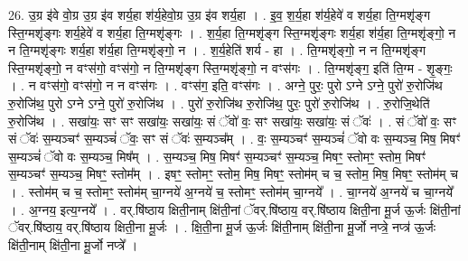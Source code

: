 \documentclass[17pt]{extarticle}
\begin{document}
26. उ॒ग्र इ॑वे वो॒ग्र उ॒ग्र इ॑व शर्य॒हा श॑र्य॒हेवो॒ग्र उ॒ग्र इ॑व शर्य॒हा । . इ॒व॒ श॒र्य॒हा श॑र्य॒हेवे॑ व शर्य॒हा ति॒ग्मशृ॑ङ्ग स्ति॒ग्मशृ॑ङ्गः शर्य॒हेवे॑ व शर्य॒हा ति॒ग्मशृ॑ङ्गः । . श॒र्य॒हा ति॒ग्मशृ॑ङ्ग स्ति॒ग्मशृ॑ङ्गः शर्य॒हा श॑र्य॒हा ति॒ग्मशृ॑ङ्गो॒ न न ति॒ग्मशृ॑ङ्गः शर्य॒हा श॑र्य॒हा ति॒ग्मशृ॑ङ्गो॒ न । . श॒र्य॒हेति॑ शर्य - हा । . ति॒ग्मशृ॑ङ्गो॒ न न ति॒ग्मशृ॑ङ्ग स्ति॒ग्मशृ॑ङ्गो॒ न वꣳस॑गो॒ वꣳस॑गो॒ न ति॒ग्मशृ॑ङ्ग स्ति॒ग्मशृ॑ङ्गो॒ न वꣳस॑गः । . ति॒ग्मशृ॑ङ्ग॒ इति॑ ति॒ग्म - शृ॒ङ्गः॒ । . न वꣳस॑गो॒ वꣳस॑गो॒ न न वꣳस॑गः । . वꣳस॑ग॒ इति॒ वꣳस॑गः । . अग्ने॒ पुरः॒ पुरो ऽग्ने ऽग्ने॒ पुरो॑ रु॒रोजि॑थ रु॒रोजि॑थ॒ पुरो ऽग्ने ऽग्ने॒ पुरो॑ रु॒रोजि॑थ । . पुरो॑ रु॒रोजि॑थ रु॒रोजि॑थ॒ पुरः॒ पुरो॑ रु॒रोजि॑थ । . रु॒रोजि॒थेति॑ रु॒रोजि॑थ । . सखा॑यः॒ सꣳ सꣳ सखा॑यः॒ सखा॑यः॒ सं ॅवो॑ वः॒ सꣳ सखा॑यः॒ सखा॑यः॒ सं ॅवः॑ । . सं ॅवो॑ वः॒ सꣳ सं ॅवः॑ स॒म्यञ्चꣳ॑ स॒म्यञ्चं॑ ॅवः॒ सꣳ सं ॅवः॑ स॒म्यञ्च᳚म् । . वः॒ स॒म्यञ्चꣳ॑ स॒म्यञ्चं॑ ॅवो वः स॒म्यञ्च॒ मिष॒ मिषꣳ॑ स॒म्यञ्चं॑ ॅवो वः स॒म्यञ्च॒ मिष᳚म् । . स॒म्यञ्च॒ मिष॒ मिषꣳ॑ स॒म्यञ्चꣳ॑ स॒म्यञ्च॒ मिषꣳ॒॒ स्तोमꣳ॒॒ स्तोम॒ मिषꣳ॑ स॒म्यञ्चꣳ॑ स॒म्यञ्च॒ मिषꣳ॒॒ स्तोम᳚म् । . इषꣳ॒॒ स्तोमꣳ॒॒ स्तोम॒ मिष॒ मिषꣳ॒॒ स्तोम॑म् च च॒ स्तोम॒ मिष॒ मिषꣳ॒॒ स्तोम॑म् च । . स्तोम॑म् च च॒ स्तोमꣳ॒॒ स्तोम॑म् चा॒ग्नये॑ अ॒ग्नये॑ च॒ स्तोमꣳ॒॒ स्तोम॑म् चा॒ग्नये᳚ । . चा॒ग्नये॑ अ॒ग्नये॑ च चा॒ग्नये᳚ । . अ॒ग्नय॒ इत्य॒ग्नये᳚ । . वर्.षि॑ष्ठाय क्षिती॒नाम् क्षि॑ती॒नां ॅवर्.षि॑ष्ठाय॒ वर्.षि॑ष्ठाय क्षिती॒ना मू॒र्ज ऊ॒र्जः क्षि॑ती॒नां ॅवर्.षि॑ष्ठाय॒ वर्.षि॑ष्ठाय क्षिती॒ना मू॒र्जः । . क्षि॒ती॒ना मू॒र्ज ऊ॒र्जः क्षि॑ती॒नाम् क्षि॑ती॒ना मू॒र्जो नप्त्रे॒ नप्त्र॑ ऊ॒र्जः क्षि॑ती॒नाम् क्षि॑ती॒ना मू॒र्जो नप्त्रे᳚ । \newline
\end{document}
